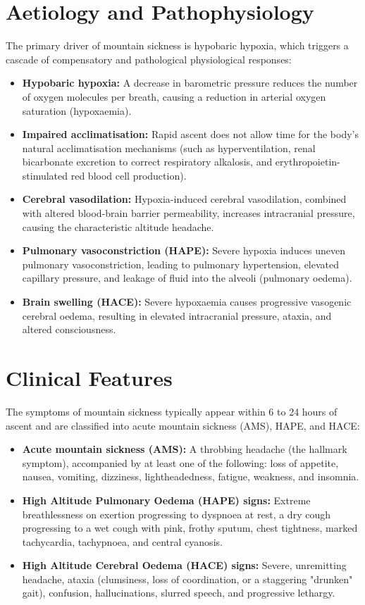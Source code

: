 \section*{Aetiology and Pathophysiology}
The primary driver of mountain sickness is hypobaric hypoxia, which triggers a cascade of compensatory and pathological physiological responses:
\begin{itemize}
    \item \textbf{Hypobaric hypoxia:} A decrease in barometric pressure reduces the number of oxygen molecules per breath, causing a reduction in arterial oxygen saturation (hypoxaemia).
    \item \textbf{Impaired acclimatisation:} Rapid ascent does not allow time for the body's natural acclimatisation mechanisms (such as hyperventilation, renal bicarbonate excretion to correct respiratory alkalosis, and erythropoietin-stimulated red blood cell production).
    \item \textbf{Cerebral vasodilation:} Hypoxia-induced cerebral vasodilation, combined with altered blood-brain barrier permeability, increases intracranial pressure, causing the characteristic altitude headache.
    \item \textbf{Pulmonary vasoconstriction (HAPE):} Severe hypoxia induces uneven pulmonary vasoconstriction, leading to pulmonary hypertension, elevated capillary pressure, and leakage of fluid into the alveoli (pulmonary oedema).
    \item \textbf{Brain swelling (HACE):} Severe hypoxaemia causes progressive vasogenic cerebral oedema, resulting in elevated intracranial pressure, ataxia, and altered consciousness.
\end{itemize}

\section*{Clinical Features}
The symptoms of mountain sickness typically appear within 6 to 24 hours of ascent and are classified into acute mountain sickness (AMS), HAPE, and HACE:
\begin{itemize}
    \item \textbf{Acute mountain sickness (AMS):} A throbbing headache (the hallmark symptom), accompanied by at least one of the following: loss of appetite, nausea, vomiting, dizziness, lightheadedness, fatigue, weakness, and insomnia.
    \item \textbf{High Altitude Pulmonary Oedema (HAPE) signs:} Extreme breathlessness on exertion progressing to dyspnoea at rest, a dry cough progressing to a wet cough with pink, frothy sputum, chest tightness, marked tachycardia, tachypnoea, and central cyanosis.
    \item \textbf{High Altitude Cerebral Oedema (HACE) signs:} Severe, unremitting headache, ataxia (clumsiness, loss of coordination, or a staggering "drunken" gait), confusion, hallucinations, slurred speech, and progressive lethargy.
\end{itemize}

